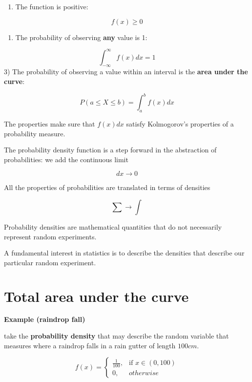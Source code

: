 \documentclass[
]{book}
\providecommand{\tightlist}{%
  \setlength{\itemsep}{0pt}\setlength{\parskip}{0pt}}
\begin{document}
\begin{enumerate}
\def\labelenumi{\arabic{enumi})}
\tightlist
\item
  The function is positive:
\end{enumerate}

\[f(x) \geq 0\]

\begin{enumerate}
\def\labelenumi{\arabic{enumi})}
\setcounter{enumi}{1}
\tightlist
\item
  The probability of observing \textbf{any} value is 1:
\end{enumerate}

\[\int_{-\infty}^{\infty} f(x) dx = 1\]
3) The probability of observing a value within an interval is the \textbf{area under the curve}:

\[P(a\leq X \leq b)=\int_{a}^{b} f(x) dx\]

The properties make sure that \(f(x)dx\) satisfy Kolmogorov's properties of a probability measure.

The probability density function is a step forward in the abstraction of probabilities: we add the continuous limit

\[dx \rightarrow 0\]

All the properties of probabilities are translated in terms of densities

\[\sum \rightarrow \int\]

Probability densities are mathematical quantities that do not necessarily represent random experiments.

A fundamental interest in statistics is to describe the densities that describe our particular random experiment.

\hypertarget{total-area-under-the-curve}{%
\section{Total area under the curve}\label{total-area-under-the-curve}}

\textbf{Example (raindrop fall)}

take the \textbf{probability density} that may describe the random variable that measures where a raindrop falls in a rain gutter of length \(100cm\).

\[
    f(x)= 
\begin{cases}
    \frac{1}{100},& \text{if } x\in (0,100)\\
    0,& otherwise 
\end{cases}
\]
\end{document}
